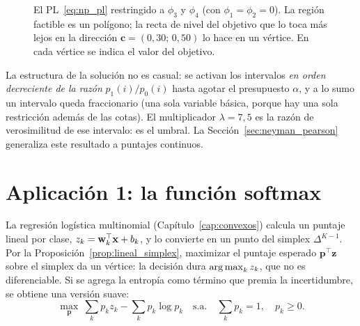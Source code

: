 \begin{figure}[ht]
\centering
{}
\caption{El PL~\eqref{eq:np_pl} restringido a $\phi_3$ y $\phi_4$ (con $\phi_1 = \phi_2 = 0$). La región factible es un
polígono; la recta de nivel del objetivo que lo toca más lejos en la dirección $\mathbf{c} = (0{,}30;\,0{,}50)$ lo
hace en un vértice. En cada vértice se indica el valor del objetivo.}
\label{fig:pl_np}
\end{figure}

La estructura de la solución no es casual: se activan los intervalos \emph{en orden decreciente de la razón}
$p_1(i)/p_0(i)$ hasta agotar el presupuesto $\alpha$, y a lo sumo un intervalo queda fraccionario (una sola
variable básica, porque hay una sola restricción además de las cotas). El multiplicador $\lambda = 7{,}5$ es la
razón de verosimilitud de ese intervalo: es el umbral. La Sección~\ref{sec:neyman_pearson} generaliza este
resultado a puntajes continuos.

\section{Aplicación 1: la función softmax}
\label{sec:softmax}

La regresión logística multinomial (Capítulo~\ref{cap:convexos}) calcula un puntaje lineal por clase,
$z_k = \mathbf{w}_k^\top\mathbf{x} + b_k$, y lo convierte en un punto del simplex $\Delta^{K-1}$. Por la
Proposición~\ref{prop:lineal_simplex}, maximizar el puntaje esperado $\mathbf{p}^\top\mathbf{z}$ sobre el simplex da un
vértice: la decisión dura $\operatorname*{arg\,max}_k z_k$, que no es diferenciable. Si se agrega la entropía como término que
premia la incertidumbre, se obtiene una versión suave:
\begin{equation}
  \max_{\mathbf{p}}\ \sum_k p_k z_k - \sum_k p_k\log p_k \quad\text{s.a.}\quad \sum_k p_k = 1,\quad p_k \ge 0.
  \label{eq:softmax_problema}
\end{equation}

